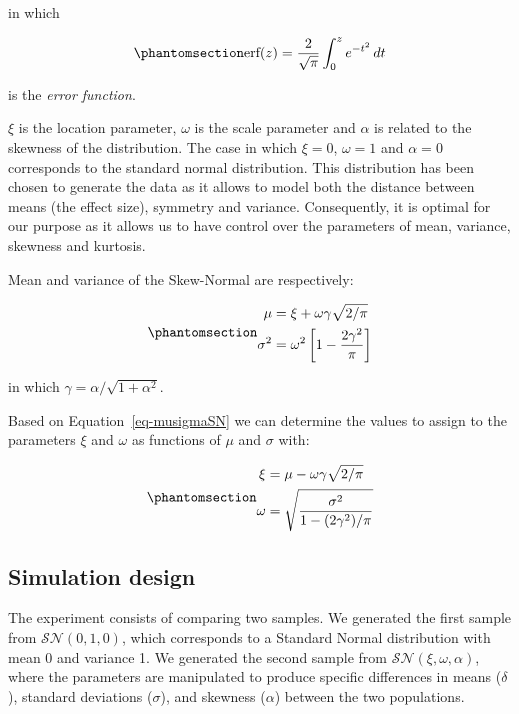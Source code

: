 \documentclass[
  12pt,
  a4paper,
  DIV=11,
  numbers=noendperiod]{scrartcl}
\begin{document}
in which

\begin{equation}\phantomsection\label{eq-erf}{
\text{erf}(z)
  = \frac{2}{\sqrt{\pi}} \int_{0}^{z} e^{-t^2}\, dt
}\end{equation}

is the \emph{error function}.

\(\xi\) is the location parameter, \(\omega\) is the scale parameter and
\(\alpha\) is related to the skewness of the distribution. The case in
which \(\xi = 0\), \(\omega = 1\) and \(\alpha = 0\) corresponds to the
standard normal distribution. This distribution has been chosen to
generate the data as it allows to model both the distance between means
(the effect size), symmetry and variance. Consequently, it is optimal
for our purpose as it allows us to have control over the parameters of
mean, variance, skewness and kurtosis.

Mean and variance of the Skew-Normal are respectively:

\begin{equation}\phantomsection\label{eq-musigmaSN}{
\begin{aligned}
\mu &= \xi + \omega \gamma \sqrt{2/\pi} \\
\sigma^2 &= \omega^2 \left[1 - \frac{2\gamma^2}{\pi}\right]
\end{aligned}
}\end{equation}

in which \(\gamma = \alpha / \sqrt{1 + \alpha^2}\).

Based on Equation~\ref{eq-musigmaSN} we can determine the values to
assign to the parameters \(\xi\) and \(\omega\) as functions of \(\mu\)
and \(\sigma\) with:

\begin{equation}\phantomsection\label{eq-xiomegaSN}{
\begin{aligned}
\xi &= \mu - \omega \gamma \sqrt{2/\pi} \\
\omega &= \sqrt{\frac{\sigma^2}{1 - (2\gamma^2)/\pi}}
\end{aligned}
}\end{equation}

\subsection{Simulation design}\label{simulation-design}

The experiment consists of comparing two samples. We generated the first
sample from \(\mathcal{SN}(0,1,0)\), which corresponds to a Standard
Normal distribution with mean 0 and variance 1. We generated the second
sample from \(\mathcal{SN}(\xi,\omega,\alpha)\), where the parameters
are manipulated to produce specific differences in means (\(\delta\)),
standard deviations (\(\sigma\)), and skewness (\(\alpha\)) between the
two populations.
\end{document}
